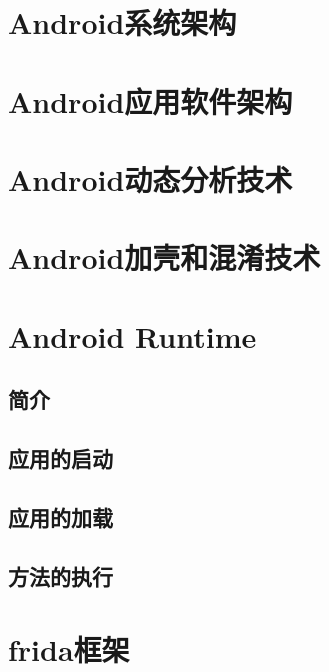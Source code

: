 \section{Android系统架构}
\section{Android应用软件架构}
\section{Android动态分析技术}
\section{Android加壳和混淆技术}
\section{Android Runtime}
\subsection{简介}
\subsection{应用的启动}
\subsection{应用的加载}
\subsection{方法的执行}
\section{frida框架}
